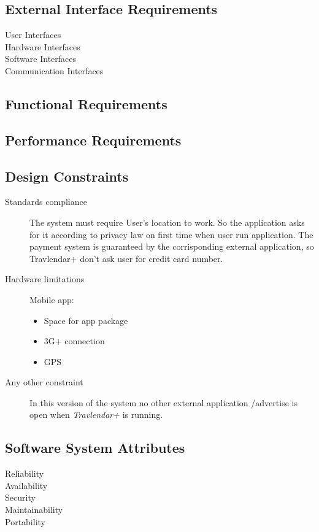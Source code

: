 \subsection{External Interface Requirements}
				\begin{description}
					\item[User Interfaces]
					\item[Hardware Interfaces]
					\item[Software Interfaces]
					\item[Communication Interfaces]
				\end{description}

\subsection{Functional Requirements}
	
			
\subsection{Performance Requirements}
		
		
\subsection{Design Constraints}
		\begin{description}
			\item[Standards compliance]
			The system must require User’s location to work. So the application asks for it according to privacy law on first time 		when user run application.
			The payment system is guaranteed by the corrisponding external application, so Travlendar+ don’t ask user for credit card number.

			\item[Hardware limitations]
			Mobile app:
			\begin{itemize}
			\item Space for app package
			\item 3G+ connection
			\item GPS
		\end{itemize}

			\item[Any other constraint]
			In this version of the system no other external application /advertise is open when \textit{Travlendar+} is running.
		\end{description}
		
\subsection{Software System Attributes}
	\begin{description}
		\item[Reliability]
		\item[Availability]
		\item[Security]
		\item[Maintainability]
		\item[Portability]
\end{description}
